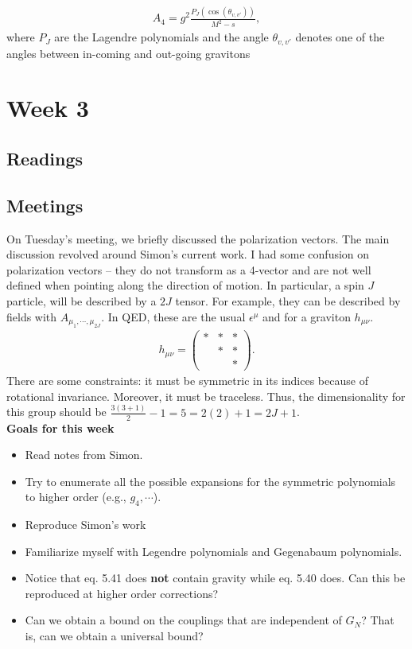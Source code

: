 \documentclass[11pt,a4paper]{article}
\begin{document}
\begin{align*}
	A_4 = g^2 \frac{P_J(\cos(\theta_{v,v'}))}{M^2 - s},
\end{align*}
where $P_J$ are the Lagendre polynomials and the angle $\theta_{v,v'}$ denotes one of the angles between in-coming and out-going gravitons

\section*{Week 3}
\subsection*{Readings}
\subsection*{Meetings}
On Tuesday's meeting, we briefly discussed the polarization vectors.  The main discussion revolved around Simon's current work.  I had some confusion on polarization vectors -- they do not transform as a 4-vector and are not well defined when pointing along the direction of motion.  In particular, a spin $J$ particle, will be described by a $2J$ tensor.  For example, they can be described by fields with $A_{\mu_1, \cdots, \mu_{2J}}$.  In QED, these are the usual $\epsilon^{\mu}$ and for a graviton $h_{\mu \nu}$.  
\begin{align*}
	h_{\mu \nu} = \begin{pmatrix}
* & * & *\\ 
 &  * & *\\ 
 &  &  *
\end{pmatrix}.
\end{align*}
There are some constraints: it must be symmetric in its indices because of rotational invariance.  Moreover, it must be traceless.  Thus, the dimensionality for this group should be $\frac{3(3+1)}{2} - 1 = 5 = 2(2) + 1 = 2J + 1$. 
\\
\textbf{Goals for this week}
\begin{itemize}
	\item Read notes from Simon.
	\item Try to enumerate all the possible expansions for the symmetric polynomials to higher order (e.g., $g_4, \cdots$).
	\item Reproduce Simon's work
	\item Familiarize myself with Legendre polynomials and Gegenabaum polynomials.
	\item Notice that eq. 5.41 does \textbf{not} contain gravity while eq. 5.40 does.  Can this be reproduced at higher order corrections?
	\item Can we obtain a bound on the couplings that are independent of $G_N$? That is, can we obtain a universal bound?
\end{itemize}
\end{document}
